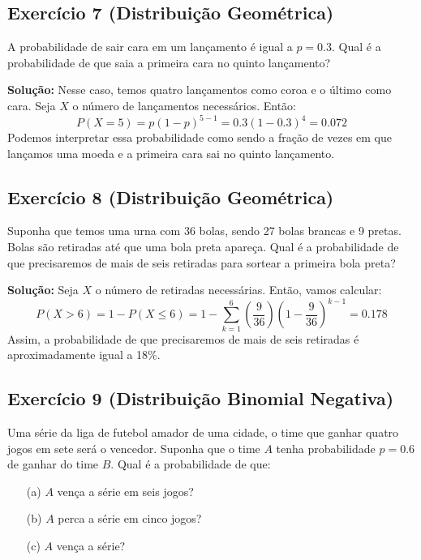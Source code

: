 \documentclass{article}
\begin{document}
\subsection{Exercício 7 (Distribuição Geométrica)}
A probabilidade de sair cara em um lançamento é igual a $p = 0.3$. Qual é a probabilidade de que saia a primeira cara no quinto lançamento?

\vspace{0.5cm}
\textbf{Solução:} Nesse caso, temos quatro lançamentos como coroa e o último como cara. Seja $X$ o número de lançamentos necessários. Então:
    $$
    P(X = 5) = p (1 - p)^{5 - 1} = 0.3 (1 - 0.3)^4 = 0.072
    $$
Podemos interpretar essa probabilidade como sendo a fração de vezes em que lançamos uma moeda e a primeira cara sai no quinto lançamento.

\subsection{Exercício 8 (Distribuição Geométrica)}
Suponha que temos uma urna com 36 bolas, sendo 27 bolas brancas e 9 pretas. Bolas são retiradas até que uma bola preta apareça. Qual é a probabilidade de que precisaremos de mais de seis retiradas para sortear a primeira bola preta?

\vspace{0.5cm}
\textbf{Solução:} Seja $X$ o número de retiradas necessárias. Então, vamos calcular:
    $$
    P(X > 6) = 1 - P(X \leq 6) = 1 - \sum_{k=1}^6 \left( \frac{9}{36} \right) \left( 1 - \frac{9}{36} \right)^{k-1} = 0.178
    $$
Assim, a probabilidade de que precisaremos de mais de seis retiradas é aproximadamente igual a 18\%.

\subsection{Exercício 9 (Distribuição Binomial Negativa)}
Uma série da liga de futebol amador de uma cidade, o time que ganhar quatro jogos em sete será o vencedor. Suponha que o time $A$ tenha probabilidade $p = 0.6$ de ganhar do time $B$. Qual é a probabilidade de que:
\begin{enumerate}
    \item[(a)] $A$ vença a série em seis jogos?
    \item[(b)] $A$ perca a série em cinco jogos?
    \item[(c)] $A$ vença a série?
\end{enumerate}
\end{document}

